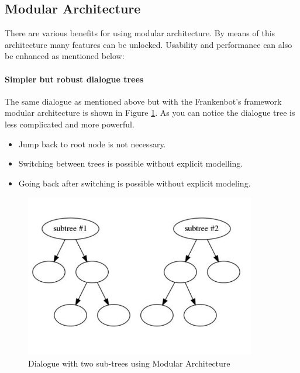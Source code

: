 \subsection{Modular Architecture}
There are various benefits for using modular architecture. 
By means of this architecture many features can be unlocked. Usability and performance can also be enhanced as mentioned below:

\paragraph*{Simpler but robust dialogue trees\label{par:simplerTree}}
The same dialogue as mentioned above but with the Frankenbot's framework modular architecture is shown in Figure \ref{fig:modArch2}. As you can notice the dialogue tree is less complicated and more powerful.
\begin{itemize}
\item Jump back to root node is not necessary.
\item Switching between trees is possible without explicit modelling.       
\item Going back after switching is possible without explicit modeling.
\end{itemize}

\begin{figure}[!h]
    \centering
    \includegraphics[width=0.9\textwidth]{img/Modular_Architecture_2.PNG}
    \caption{Dialogue with two sub-trees using Modular Architecture}
    \label{fig:modArch2}
\end{figure}

